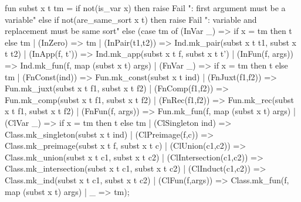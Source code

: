 \nwenddocs{}\endmoddef\nwstartdeflinemarkup{}\nwenddeflinemarkup
fun subst x t tm =
  if not(is_var x)
  then raise Fail ": first argument must be a variable"
  else if not(are_same_sort x t)
  then raise Fail ": variable and replacement must be same sort"
  else (case tm of
   (InVar _) => if x = tm then t else tm
 | (InZero) => tm
 | (InPair(t1,t2)) => Ind.mk_pair(subst x t t1, subst x t t2)
 | (InApp(f, t')) => Ind.mk_app(subst x t f, subst x t t')
 | (InFun(f, args)) => Ind.mk_fun(f, map (subst x t) args)
 | (FnVar _) => if x = tm then t else tm
 | (FnConst(ind)) => Fun.mk_const(subst x t ind)
 | (FnJuxt(f1,f2)) => Fun.mk_juxt(subst x t f1, subst x t f2)
 | (FnComp(f1,f2)) => Fun.mk_comp(subst x t f1, subst x t f2)
 | (FnRec(f1,f2)) => Fun.mk_rec(subst x t f1, subst x t f2)
 | (FnFun(f, args)) => Fun.mk_fun(f, map (subst x t) args)
 | (ClVar _) => if x = tm then t else tm
 | (ClSingleton ind) => Class.mk_singleton(subst x t ind)
 | (ClPreimage(f,c)) => Class.mk_preimage(subst x t f, subst x t c)
 | (ClUnion(c1,c2)) => Class.mk_union(subst x t c1, subst x t c2)
 | (ClIntersection(c1,c2)) => Class.mk_intersection(subst x t c1, subst x t c2)
 | (ClInduct(c1,c2)) => Class.mk_ind(subst x t c1, subst x t c2)
 | (ClFun(f,args)) => Class.mk_fun(f, map (subst x t) args)
 | _ => tm);
\eatline
{}\nwendcode{}\nwdocspar
